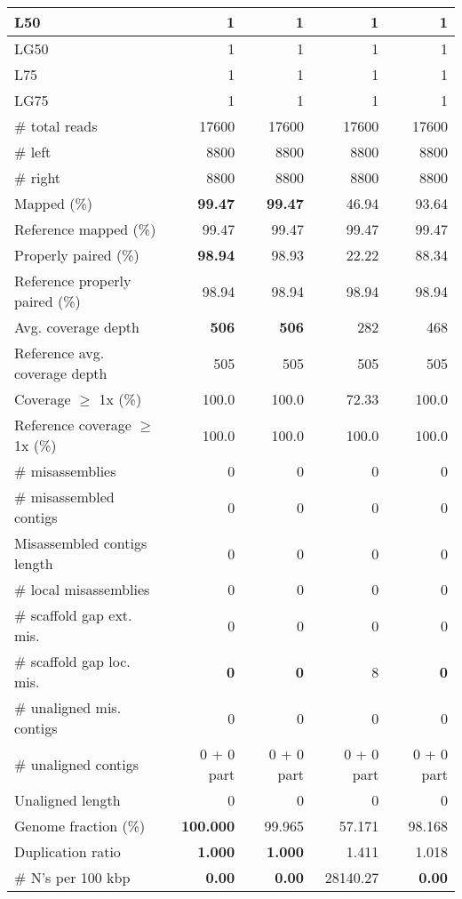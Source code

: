 \documentclass[12pt,a4paper]{article}
\begin{document}
\begin{table}[ht]
\begin{center}
\begin{tabular}{|l*{4}{|r}|}
L50 & 1 & 1 & 1 & 1 \\ \hline
LG50 & 1 & 1 & 1 & 1 \\ \hline
L75 & 1 & 1 & 1 & 1 \\ \hline
LG75 & 1 & 1 & 1 & 1 \\ \hline
\# total reads & 17600 & 17600 & 17600 & 17600 \\ \hline
\# left & 8800 & 8800 & 8800 & 8800 \\ \hline
\# right & 8800 & 8800 & 8800 & 8800 \\ \hline
Mapped (\%) & {\bf 99.47} & {\bf 99.47} & 46.94 & 93.64 \\ \hline
Reference mapped (\%) & 99.47 & 99.47 & 99.47 & 99.47 \\ \hline
Properly paired (\%) & {\bf 98.94} & 98.93 & 22.22 & 88.34 \\ \hline
Reference properly paired (\%) & 98.94 & 98.94 & 98.94 & 98.94 \\ \hline
Avg. coverage depth & {\bf 506} & {\bf 506} & 282 & 468 \\ \hline
Reference avg. coverage depth & 505 & 505 & 505 & 505 \\ \hline
Coverage $\geq$ 1x (\%) & 100.0 & 100.0 & 72.33 & 100.0 \\ \hline
Reference coverage $\geq$ 1x (\%) & 100.0 & 100.0 & 100.0 & 100.0 \\ \hline
\# misassemblies & 0 & 0 & 0 & 0 \\ \hline
\# misassembled contigs & 0 & 0 & 0 & 0 \\ \hline
Misassembled contigs length & 0 & 0 & 0 & 0 \\ \hline
\# local misassemblies & 0 & 0 & 0 & 0 \\ \hline
\# scaffold gap ext. mis. & 0 & 0 & 0 & 0 \\ \hline
\# scaffold gap loc. mis. & {\bf 0} & {\bf 0} & 8 & {\bf 0} \\ \hline
\# unaligned mis. contigs & 0 & 0 & 0 & 0 \\ \hline
\# unaligned contigs & 0 + 0 part & 0 + 0 part & 0 + 0 part & 0 + 0 part \\ \hline
Unaligned length & 0 & 0 & 0 & 0 \\ \hline
Genome fraction (\%) & {\bf 100.000} & 99.965 & 57.171 & 98.168 \\ \hline
Duplication ratio & {\bf 1.000} & {\bf 1.000} & 1.411 & 1.018 \\ \hline
\# N's per 100 kbp & {\bf 0.00} & {\bf 0.00} & 28140.27 & {\bf 0.00} \\ \hline

\end{tabular}
\end{center}
\end{table}
\end{document}
